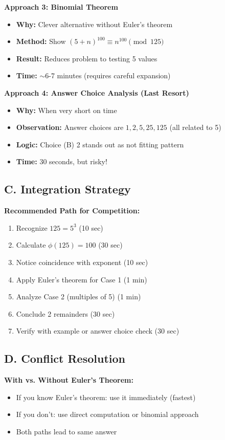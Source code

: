 \documentclass[12pt]{article}
\begin{document}
\begin{techniquesbox}
\textbf{Approach 3: Binomial Theorem}
\begin{itemize}
    \item \textbf{Why:} Clever alternative without Euler's theorem
    \item \textbf{Method:} Show $(5+n)^{100} \equiv n^{100} \pmod{125}$
    \item \textbf{Result:} Reduces problem to testing 5 values
    \item \textbf{Time:} $\sim$6-7 minutes (requires careful expansion)
\end{itemize}

\textbf{Approach 4: Answer Choice Analysis (Last Resort)}
\begin{itemize}
    \item \textbf{Why:} When very short on time
    \item \textbf{Observation:} Answer choices are $1, 2, 5, 25, 125$ (all related to 5)
    \item \textbf{Logic:} Choice (B) 2 stands out as not fitting pattern
    \item \textbf{Time:} 30 seconds, but risky!
\end{itemize}

\subsection*{C. Integration Strategy}

\textbf{Recommended Path for Competition:}
\begin{enumerate}
    \item Recognize $125 = 5^3$ (10 sec)
    \item Calculate $\phi(125) = 100$ (30 sec)
    \item Notice coincidence with exponent (10 sec)
    \item Apply Euler's theorem for Case 1 (1 min)
    \item Analyze Case 2 (multiples of 5) (1 min)
    \item Conclude 2 remainders (30 sec)
    \item Verify with example or answer choice check (30 sec)
\end{enumerate}

\subsection*{D. Conflict Resolution}

\textbf{With vs. Without Euler's Theorem:}
\begin{itemize}
    \item If you know Euler's theorem: use it immediately (fastest)
    \item If you don't: use direct computation or binomial approach
    \item Both paths lead to same answer
\end{itemize}
\end{techniquesbox}
\end{document}
